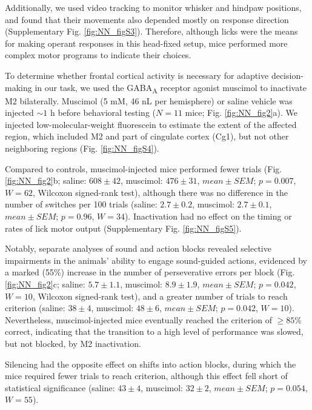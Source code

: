 Additionally, we used video tracking to monitor whisker and hindpaw positions, and found that their movements also depended mostly on response direction (Supplementary Fig. \ref{fig:NN_figS3}). Therefore, although licks were the means for making operant responses in this head-fixed setup, mice performed more complex motor programs to indicate their choices.

To determine whether frontal cortical activity is necessary for adaptive decision-making in our task, we used the GABA\textsubscript{A} receptor agonist muscimol to inactivate M2 bilaterally. Muscimol (5 mM, 46 nL per hemisphere) or saline vehicle was injected $\sim 1$ h before behavioral testing ($N=11$ mice; Fig. \ref{fig:NN_fig2}a). We injected low-molecular-weight fluorescein to estimate the extent of the affected region, which included M2 and part of cingulate cortex (Cg1), but not other neighboring regions (Fig. \ref{fig:NN_figS4}).


Compared to controls, muscimol-injected mice performed fewer trials (Fig. \ref{fig:NN_fig2}b; saline: $608 \pm 42$, muscimol: $476 \pm 31$, $\mathit{mean}\pm\mathit{SEM}$; $p = 0.007$, $W = 62$, Wilcoxon signed-rank test), although there was no difference in the number of switches per 100 trials (saline: $2.7 \pm 0.2$, muscimol: $2.7 \pm 0.1$, $\mathit{mean}\pm\mathit{SEM}$; $p = 0.96$, $W = 34$). Inactivation had no effect on the timing or rates of lick motor output (Supplementary Fig. \ref{fig:NN_figS5}). 

Notably, separate analyses of sound and action blocks revealed selective impairments in the animals' ability to engage sound-guided actions, evidenced by a marked (55\%) increase in the number of perseverative errors per block (Fig. \ref{fig:NN_fig2}c; saline: $5.7 \pm 1.1$, muscimol: $8.9 \pm 1.9$, $\mathit{mean}\pm\mathit{SEM}$; $p = 0.042$, $W = 10$, Wilcoxon signed-rank test), and a greater number of trials to reach criterion (saline: $38 \pm 4$, muscimol: $48 \pm 6$, $\mathit{mean}\pm\mathit{SEM}$; $p = 0.042$, $W = 10$). Nevertheless, muscimol-injected mice eventually reached the criterion of $\ge 85\%$ correct, indicating that the transition to a high level of performance was slowed, but not blocked, by M2 inactivation. 

Silencing had the opposite effect on shifts into action blocks, during which the mice required fewer trials to reach criterion, although this effect fell short of statistical significance (saline: $43 \pm 4$, muscimol: $32 \pm 2$, $\mathit{mean}\pm\mathit{SEM}$; $p = 0.054$, $W = 55$). 

